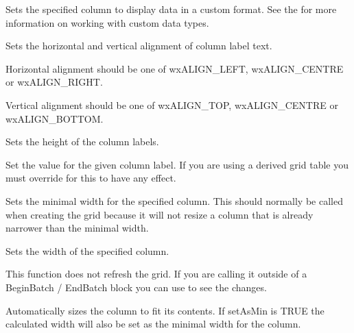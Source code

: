 Sets the specified column to display data in a custom format.
See the  for more information on working
with custom data types.

\label{wxgridsetcollabelalignment}


Sets the horizontal and vertical alignment of column label text.

Horizontal alignment should be one of wxALIGN\_LEFT, wxALIGN\_CENTRE or wxALIGN\_RIGHT.

Vertical alignment should be one of wxALIGN\_TOP, wxALIGN\_CENTRE or wxALIGN\_BOTTOM.

\label{wxgridsetcollabelsize}


Sets the height of the column labels.

\label{wxgridsetcollabelvalue}


Set the value for the given column label. If you are using a derived grid table you must 
override 
for this to have any effect.

\label{wxgridsetcolminimalwidth}


Sets the minimal width for the specified column. This should normally be called when creating the grid
because it will not resize a column that is already narrower than the minimal width.

\label{wxgridsetcolsize}


Sets the width of the specified column. 

This function does not refresh the grid. If you are calling it outside of a BeginBatch / EndBatch
block you can use  to see the changes. 

Automatically sizes the column to fit its contents. If setAsMin is TRUE the calculated width will
also be set as the minimal width for the column.


